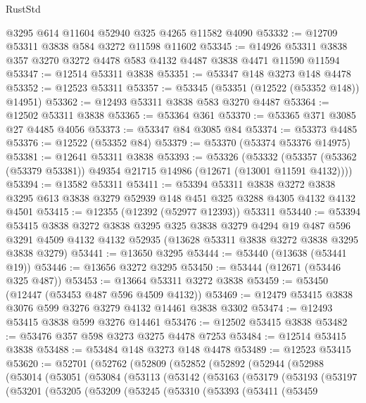 \begin{lexlean}{RustStd}
\begin{coremodule}
    @3295
    @614
    @11604
    @52940
    @325
    @4265
    @11582
    @4090
@53332 := @12709 @53311 @3838 @584 @3272 @11598 @11602
@53345 := @14926 @53311 @3838 @357 @3270 @3272 @4478 @583 @4132 @4487 @3838 @4471 @11590 @11594
@53347 := @12514 @53311 @3838
@53351 := @53347 @148 @3273 @148 @4478
@53352 := @12523 @53311
@53357 := @53345 (@53351 (@12522 (@53352 @148)) @14951)
@53362 := @12493 @53311 @3838 @583 @3270 @4487
@53364 := @12502 @53311 @3838
@53365 := @53364 @361
@53370 := @53365 @371 @3085 @27 @4485 @4056
@53373 := @53347 @84 @3085 @84
@53374 := @53373 @4485
@53376 := @12522 (@53352 @84)
@53379 := @53370 (@53374 @53376 @14975)
@53381 := @12641 @53311 @3838
@53393 := @53326
    (@53332 (@53357 (@53362 (@53379 @53381)) @49354 @21715 @14986 (@12671 (@13001 @11591 @4132))))
@53394 := @13582 @53311
@53411 := @53394
    @53311
    @3838
    @3272
    @3838
    @3295
    @613
    @3838
    @3279
    @52939
    @148
    @451
    @325
    @3288
    @4305
    @4132
    @4132
    @4501
@53415 := @12355 (@12392 (@52977 @12393)) @53311
@53440 := @53394
    @53415
    @3838
    @3272
    @3838
    @3295
    @325
    @3838
    @3279
    @4294
    @19
    @487
    @596
    @3291
    @4509
    @4132
    @4132
    @52935
    (@13628 @53311 @3838 @3272 @3838 @3295 @3838 @3279)
@53441 := @13650 @3295
@53444 := @53440 (@13638 (@53441 @19))
@53446 := @13656 @3272 @3295
@53450 := @53444 (@12671 (@53446 @325 @487))
@53453 := @13664 @53311 @3272 @3838
@53459 := @53450 (@12447 (@53453 @487 @596 @4509 @4132))
@53469 := @12479 @53415 @3838 @3076 @599 @3276 @3279 @4132 @14461 @3838 @3302
@53474 := @12493 @53415 @3838 @599 @3276 @14461
@53476 := @12502 @53415 @3838
@53482 := @53476 @357 @598 @3273 @3275 @4478 @7253
@53484 := @12514 @53415 @3838
@53488 := @53484 @148 @3273 @148 @4478
@53489 := @12523 @53415
@53620 := @52701
    (@52762
      (@52809
        (@52852
          (@52892
            (@52944
              (@52988
                (@53014
                  (@53051
                    (@53084
                      (@53113
                        (@53142
                          (@53163
                            (@53179
                              (@53193
                                (@53197
                                  (@53201
                                    (@53205
                                      (@53209
                                        (@53245
                                          (@53310
                                            (@53393
                                              (@53411
                                                (@53459

\end{coremodule}
\end{lexlean}
